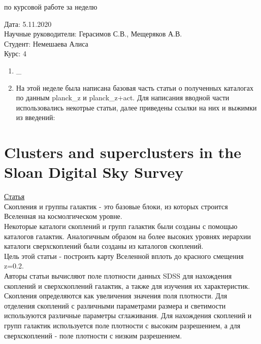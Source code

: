 \documentclass{article}
\begin{document}
\begin{center}{ по курсовой работе за неделю\\}\end{center}
Дата: 5.11.2020\\
Научные руководители: Герасимов С.В., Мещеряков А.В.\\
Студент: Немешаева Алиса\\
Курс: 4\\

\renewcommand{\labelitemi}{$\blacksquare$}
\renewcommand\labelitemii{$\square$}
\begin{enumerate}
    \item \_\\
    \item На этой неделе была написана базовая часть статьи о полученных каталогах по данным 
        planck\_z и planck\_z+act. Для написания вводной части использовались некотрые статьи, 
        далее приведены ссылки на них и выжимки из введений:\\
\end{enumerate}
\section{Clusters and superclusters in the Sloan Digital Sky Survey}
\hyperlink{https://www.aanda.org/articles/aa/pdf/2003/26/aah4162.pdf}{Статья}\\

Скопления и группы галактик - это базовые блоки, из которых строится Вселенная на космолгическом 
уровне.\\

Некоторые каталоги скоплений и групп галактик были созданы с помощью каталогов галактик. Аналогичным 
образом на более высоких уровнях иерархии каталоги сверхскоплений были созданы из каталогов скоплений.\\

Цель этой статьи - построить карту Вселенной вплоть до красного смещения z=0.2.\\

Авторы статьи вычисляют поле плотности данных SDSS для нахождения скоплений и сверхскоплений галактик,
а также для изучения их характеристик.\\

Скопления определяются как увеличения значения поля плотности. Для отделения скоплений с различными
параметрами размера и светимости используются различные параметры сглаживания. Для нахождения 
скоплений и групп галактик используется поле плотности с высоким разрешением, а для сверхскоплений 
- поле плотности с низким разрешением.\\ 
\end{document}
